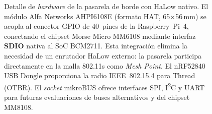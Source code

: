 \begin{figure}[H]
\begin{tikzpicture}
\end{tikzpicture}
\caption{Detalle de \textit{hardware} de la pasarela de borde con HaLow nativo.  El módulo Alfa Networks AHPI6108E (formato HAT, 65$\times$56\,mm) se acopla al conector GPIO de 40~pines de la Raspberry~Pi~4, conectando el chipset Morse Micro MM6108 mediante interfaz \textbf{SDIO} nativa al SoC BCM2711.  Esta integración elimina la necesidad de un enrutador HaLow externo: la pasarela participa directamente en la malla 802.11s como \emph{Mesh Point}.  El nRF52840 USB Dongle proporciona la radio IEEE~802.15.4 para Thread (OTBR).  El \emph{socket} mikroBUS ofrece interfaces SPI, I\textsuperscript{2}C y UART para futuras evaluaciones de buses alternativos y del chipset MM8108.}
\label{fig:halow-hardware-detail}
\end{figure}
